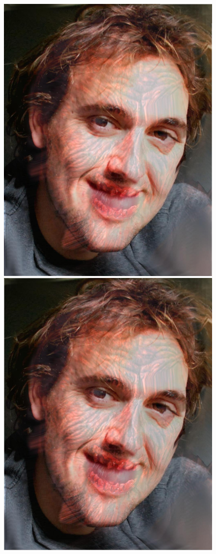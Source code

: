 \documentclass[11pt]{article}
\begin{document}
\begin{figure}[H]
\begin{center}
\includegraphics[scale=0.08]{figs/zombie/zombie_bf_07.jpg} 
\includegraphics[scale=0.08]{figs/zombie/zombie_bf_08.jpg} 

\end{center}
\end{figure}
\end{document}
